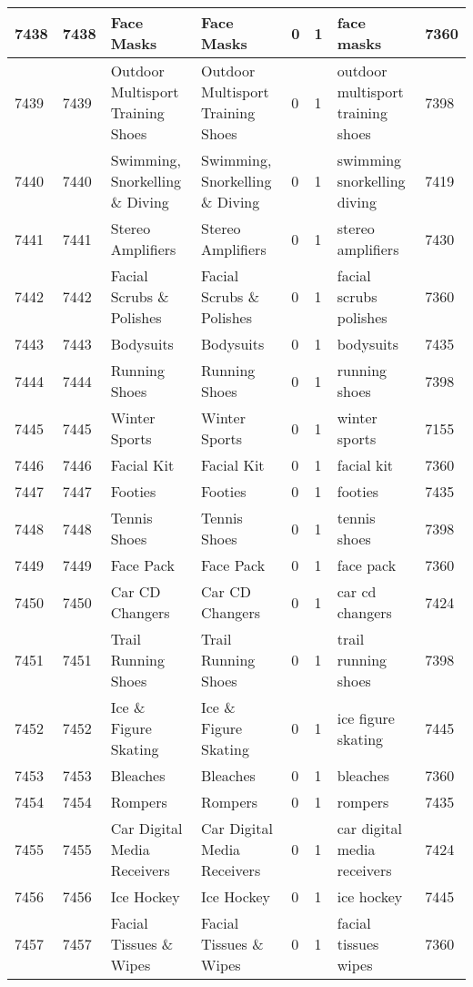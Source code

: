 \begin{longtable}{|l|l|l|l|l|l|l|l|}
7438 & 7438 & Face Masks & Face Masks & 0 & 1 & face masks & 7360 \\ \hline 
7439 & 7439 & Outdoor Multisport Training Shoes & Outdoor Multisport Training Shoes & 0 & 1 & outdoor multisport training shoes & 7398 \\ \hline 
7440 & 7440 & Swimming, Snorkelling \& Diving & Swimming, Snorkelling \& Diving & 0 & 1 & swimming snorkelling diving & 7419 \\ \hline 
7441 & 7441 & Stereo Amplifiers & Stereo Amplifiers & 0 & 1 & stereo amplifiers & 7430 \\ \hline 
7442 & 7442 & Facial Scrubs \& Polishes & Facial Scrubs \& Polishes & 0 & 1 & facial scrubs polishes & 7360 \\ \hline 
7443 & 7443 & Bodysuits & Bodysuits & 0 & 1 & bodysuits & 7435 \\ \hline 
7444 & 7444 & Running Shoes & Running Shoes & 0 & 1 & running shoes & 7398 \\ \hline 
7445 & 7445 & Winter Sports & Winter Sports & 0 & 1 & winter sports & 7155 \\ \hline 
7446 & 7446 & Facial Kit & Facial Kit & 0 & 1 & facial kit & 7360 \\ \hline 
7447 & 7447 & Footies & Footies & 0 & 1 & footies & 7435 \\ \hline 
7448 & 7448 & Tennis Shoes & Tennis Shoes & 0 & 1 & tennis shoes & 7398 \\ \hline 
7449 & 7449 & Face Pack & Face Pack & 0 & 1 & face pack & 7360 \\ \hline 
7450 & 7450 & Car CD Changers & Car CD Changers & 0 & 1 & car cd changers & 7424 \\ \hline 
7451 & 7451 & Trail Running Shoes & Trail Running Shoes & 0 & 1 & trail running shoes & 7398 \\ \hline 
7452 & 7452 & Ice \& Figure Skating & Ice \& Figure Skating & 0 & 1 & ice figure skating & 7445 \\ \hline 
7453 & 7453 & Bleaches & Bleaches & 0 & 1 & bleaches & 7360 \\ \hline 
7454 & 7454 & Rompers & Rompers & 0 & 1 & rompers & 7435 \\ \hline 
7455 & 7455 & Car Digital Media Receivers & Car Digital Media Receivers & 0 & 1 & car digital media receivers & 7424 \\ \hline 
7456 & 7456 & Ice Hockey & Ice Hockey & 0 & 1 & ice hockey & 7445 \\ \hline 
7457 & 7457 & Facial Tissues \& Wipes & Facial Tissues \& Wipes & 0 & 1 & facial tissues wipes & 7360 \\ \hline 

\end{longtable}
